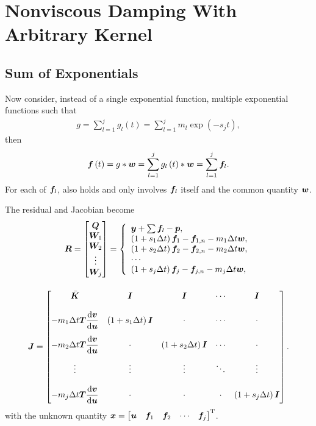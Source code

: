 \section{Nonviscous Damping With Arbitrary Kernel}
\subsection{Sum of Exponentials}
Now consider, instead of a single exponential function, multiple exponential functions such that
\begin{gather}
g=\sum_{l=1}^{j}g_l\left(t\right)=\sum_{l=1}^{j}m_l\exp\left(-s_jt\right),
\end{gather}
then
\begin{gather}\label{eq:single_conv}
\bm{f}\left(t\right)=g*\bm{w}=\sum_{l=1}^{j}g_l\left(t\right)*\bm{w}=\sum_{l=1}^{j}\bm{f}_l.
\end{gather}
For each of $\bm{f}_l$,  also holds and only involves $\bm{f}_l$ itself and the common quantity $\bm{w}$.

The residual and Jacobian become
\begin{gather}\label{eq:residual_multi}
\bm{R}=\begin{bmatrix}
\bm{Q}\\\bm{W}_1\\\bm{W}_2\\\vdots\\\bm{W}_j
\end{bmatrix}=\left\{
\begin{array}{l}
\bm{y}+\sum\bm{f}_l-\bm{p},\\
\left(1+s_1\Delta{}t\right)\bm{f}_1-\bm{f}_{1,n}-m_1\Delta{}t\bm{w},\\
\left(1+s_2\Delta{}t\right)\bm{f}_2-\bm{f}_{2,n}-m_2\Delta{}t\bm{w},\\
\cdots\\
\left(1+s_j\Delta{}t\right)\bm{f}_j-\bm{f}_{j,n}-m_j\Delta{}t\bm{w},\\
\end{array}
\right.\\[4mm]\label{eq:jacobian_multi}
\bm{J}=\begin{bmatrix}
\bar{\bm{K}}&\bm{I}&\bm{I}&\cdots&\bm{I}\\[4mm]
-m_1\Delta{}t\bm{T}\dfrac{\mathrm{d}\bm{v}}{\mathrm{d}\bm{u}}&\left(1+s_1\Delta{}t\right)\bm{I}&\cdot&\cdots&\cdot\\[4mm]
-m_2\Delta{}t\bm{T}\dfrac{\mathrm{d}\bm{v}}{\mathrm{d}\bm{u}}&\cdot&\left(1+s_2\Delta{}t\right)\bm{I}&\cdots&\cdot\\[4mm]
\vdots&\vdots&\vdots&\ddots&\vdots\\[4mm]
-m_j\Delta{}t\bm{T}\dfrac{\mathrm{d}\bm{v}}{\mathrm{d}\bm{u}}&\cdot&\cdot&\cdot&\left(1+s_j\Delta{}t\right)\bm{I}
\end{bmatrix}.
\end{gather}
with the unknown quantity $\bm{x}=\begin{bmatrix}
\bm{u}&\bm{f}_1&\bm{f}_2&\cdots&\bm{f}_j
\end{bmatrix}^{\mathrm{T}}$.

